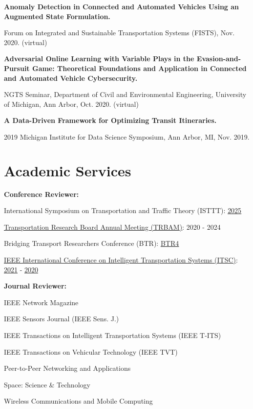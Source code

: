 \documentclass[]{Keval-resume}
\begin{document}
\sectionsep
\textbf{Anomaly Detection in Connected and Automated Vehicles Using an Augmented State Formulation.}
\begin{cvitems}
    \item 
    {Forum on Integrated and Sustainable Transportation Systems (FISTS), Nov. 2020. (virtual)}
\end{cvitems}
\sectionsep
\textbf{Adversarial Online Learning with Variable Plays in the Evasion-and-Pursuit Game: Theoretical Foundations and Application in Connected and Automated Vehicle Cybersecurity.}
\begin{cvitems}
    \item 
    {NGTS Seminar, Department of Civil and Environmental Engineering, University of Michigan, Ann Arbor, Oct. 2020. (virtual)}
\end{cvitems}
\sectionsep
\textbf{A Data-Driven Framework for Optimizing Transit Itineraries.}
\begin{cvitems}
    \item 
    {2019 Michigan Institute for Data Science Symposium, Ann Arbor, MI, Nov. 2019.}
\end{cvitems}
\sectionsep
\section{Academic Services}
\hrulefill
\postsectionsep

\textbf{Conference Reviewer:} 
\begin{cvitems}
    \item {International Symposium on Transportation and Traffic Theory (ISTTT): \href{https://limos.engin.umich.edu/isttt25/}{\underline{2025}}}
    \item {\href{https://www.trb.org/AnnualMeeting/AnnualMeeting.aspx}{\underline{Transportation Research Board Annual Meeting (TRBAM)}}: 2020 - 2024}
    \item {Bridging Transport Researchers Conference (BTR): \href{https://easychair.org/cfp/BTR4}{\underline{BTR4}}}  
    \item {\href{https://ieee-itss.org/conf/itsc/}{\underline{IEEE International Conference on Intelligent Transportation Systems (ITSC)}}: \href{https://2021.ieee-itsc.org/}{\underline{2021}} - \href{https://www.ieee-itsc2020.org/}{\underline{2020}}
    }
\end{cvitems}
\sectionsep
\textbf{Journal Reviewer:} 
\begin{cvitems}
    \item {IEEE Network Magazine}
    \item {IEEE Sensors Journal (IEEE Sens. J.)}
    \item {IEEE Transactions on Intelligent Transportation Systems (IEEE T-ITS)}
    \item {IEEE Transactions on Vehicular Technology (IEEE TVT)}
    \item {Peer-to-Peer Networking and Applications}
    \item {Space: Science \& Technology}
    \item {Wireless Communications and Mobile Computing}
\end{cvitems}
\end{document}

